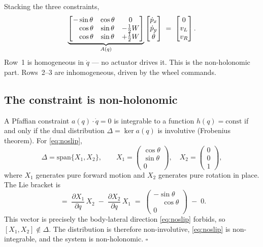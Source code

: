 Stacking the three constraints,
\begin{equation}
    \underbrace{\begin{bmatrix}
        -\sin\theta & \cos\theta & 0 \\
        \phantom{-}\cos\theta & \sin\theta & -\tfrac{1}{2}W \\
        \phantom{-}\cos\theta & \sin\theta & +\tfrac{1}{2}W
    \end{bmatrix}}_{A(q)}
    \begin{bmatrix}\dot p_x \\ \dot p_y \\ \dot\theta\end{bmatrix}
    \;=\;
    \begin{bmatrix} 0 \\ v_L \\ v_R \end{bmatrix}.
    \label{eq:pfaffian}
\end{equation}
Row~1 is homogeneous in $\dot q$ --- no actuator drives it. This is the
non-holonomic part. Rows~2--3 are inhomogeneous, driven by the wheel
commands.

\subsection{The constraint is non-holonomic}

A Pfaffian constraint $a(q) \cdot \dot q = 0$ is integrable to a function
$h(q) = \mathrm{const}$ if and only if the dual distribution
$\Delta = \ker a(q)$ is involutive (Frobenius theorem). For
\eqref{eq:noslip},
\begin{equation}
    \Delta = \mathrm{span}\{X_1, X_2\},
    \qquad
    X_1 = \begin{pmatrix}\cos\theta \\ \sin\theta \\ 0\end{pmatrix},
    \quad
    X_2 = \begin{pmatrix}0 \\ 0 \\ 1\end{pmatrix},
\end{equation}
where $X_1$ generates pure forward motion and $X_2$ generates pure rotation
in place. The Lie bracket is
\begin{equation}
    [X_1, X_2]
    \;=\; \frac{\partial X_1}{\partial q}\,X_2 \;-\; \frac{\partial X_2}{\partial q}\,X_1
    \;=\; \begin{pmatrix} -\sin\theta \\ \phantom{-}\cos\theta \\ 0 \end{pmatrix} \;-\; 0.
\end{equation}
This vector is precisely the body-lateral direction \eqref{eq:noslip}
forbids, so $[X_1, X_2] \notin \Delta$. The distribution is therefore
non-involutive, \eqref{eq:noslip} is non-integrable, and the system is
non-holonomic. \(\square\)

